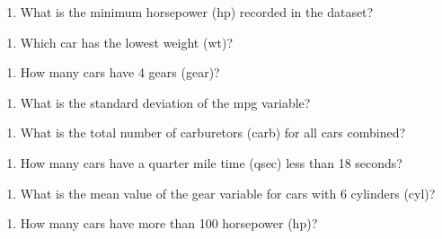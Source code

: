 \documentclass[
  letterpaper,
  DIV=11,
  numbers=noendperiod]{scrreprt}
\providecommand{\tightlist}{%
  \setlength{\itemsep}{0pt}\setlength{\parskip}{0pt}}\usepackage{longtable,booktabs,array}
\begin{document}
\begin{enumerate}
\def\labelenumi{\arabic{enumi}.}
\setcounter{enumi}{12}
\tightlist
\item
  What is the minimum horsepower (hp) recorded in the dataset?
\end{enumerate}

\begin{enumerate}
\def\labelenumi{\arabic{enumi}.}
\setcounter{enumi}{13}
\tightlist
\item
  Which car has the lowest weight (wt)?
\end{enumerate}

\begin{enumerate}
\def\labelenumi{\arabic{enumi}.}
\setcounter{enumi}{14}
\tightlist
\item
  How many cars have 4 gears (gear)?
\end{enumerate}

\begin{enumerate}
\def\labelenumi{\arabic{enumi}.}
\setcounter{enumi}{15}
\tightlist
\item
  What is the standard deviation of the mpg variable?
\end{enumerate}

\begin{enumerate}
\def\labelenumi{\arabic{enumi}.}
\setcounter{enumi}{16}
\tightlist
\item
  What is the total number of carburetors (carb) for all cars combined?
\end{enumerate}

\begin{enumerate}
\def\labelenumi{\arabic{enumi}.}
\setcounter{enumi}{17}
\tightlist
\item
  How many cars have a quarter mile time (qsec) less than 18 seconds?
\end{enumerate}

\begin{enumerate}
\def\labelenumi{\arabic{enumi}.}
\setcounter{enumi}{18}
\tightlist
\item
  What is the mean value of the gear variable for cars with 6 cylinders
  (cyl)?
\end{enumerate}

\begin{enumerate}
\def\labelenumi{\arabic{enumi}.}
\setcounter{enumi}{19}
\tightlist
\item
  How many cars have more than 100 horsepower (hp)?
\end{enumerate}
\end{document}
